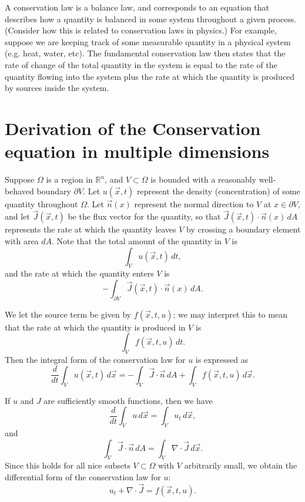 \label{lab:finitedifference1}

A conservation law is a balance law, and corresponds to an equation that describes how a quantity is balanced in some system throughout a given process.
(Consider how this is related to conservation laws in physics.)
For example, suppose we are keeping track of some measurable quantity in a physical system (e.g. heat, water, etc).
The fundamental conservation law then states that the rate of change of the total quantity in the system is equal to the rate of the quantity flowing into the system plus the rate at which the quantity is produced by sources inside the system.

\section*{Derivation of the Conservation equation in multiple dimensions}
Suppose $\Omega$ is a region in $\mathbb{R}^n$, and $V \subset \Omega$ is bounded with a reasonably well-behaved boundary $\partial V$.
Let $u(\vec{x},t)$ represent the density (concentration) of some quantity throughout $\Omega$.
Let $\vec{n}(x)$ represent the normal direction to $V$ at $x \in \partial V$, and let $\vec{J}(\vec{x},t)$ be the flux vector for the quantity, so that $\vec{J}(\vec{x},t) \cdot \vec{n}(x) \, dA$ represents the rate at which the quantity leaves $V$ by crossing a boundary element with area $dA$.
Note that the total amount of the quantity in $V$ is
\[ \int_V u(\vec{x},t)\, dt,\]
and the rate at which the quantity enters $V$ is
\[-\int_{\partial V} \vec{J}(\vec{x},t) \cdot \vec{n}(x) \, dA.\]

We let the source term be given by $f(\vec{x},t,u)$; we may interpret this to mean that the rate at which the quantity is produced in $V$ is
\[\int_V f(\vec{x},t,u)\, dt.\]
Then the integral form of the conservation law for $u$ is expressed as
\[\frac{d}{dt} \int_V u(\vec{x},t) \, d\vec{x} = -\int_V \vec{J}\cdot \vec{n}\, dA + \int_V f(\vec{x},t,u)\, d\vec{x}.\]

If $u$ and $J$ are sufficiently smooth functions, then we have
\[ \frac{d}{dt} \int_V u\, d\vec{x} = \int_V u_t \, d\vec{x},\]
and
\[ \int_V \vec{J}\cdot \vec{n}\, dA = \int_V \nabla \cdot \vec{J}\, d\vec{x} .\]
Since this holds for all nice subsets $V \subset \Omega$ with $V$ arbitrarily small, we obtain the differential form of the conservation law for $u$:
\[ u_t + \nabla \cdot \vec{J} = f(\vec{x},t,u) .\]

